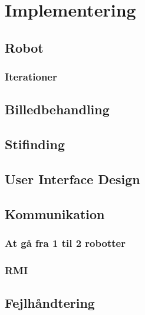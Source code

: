 \chapter{Implementering}

\section{Robot}
\subsection{Iterationer}

\section{Billedbehandling}

\section{Stifinding}

\section{User Interface Design}
\section{Kommunikation}
\subsection{At gå fra 1 til 2 robotter}
\subsection{RMI}

\section{Fejlhåndtering}